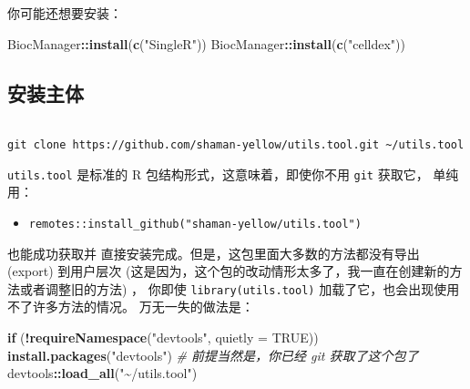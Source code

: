 \documentclass[
]{article}
\newenvironment{Shaded}{\begin{snugshade}}{\end{snugshade}}
\newcommand{\CommentTok}[1]{\textcolor[rgb]{0.56,0.35,0.01}{\textit{#1}}}
\newcommand{\ControlFlowTok}[1]{\textcolor[rgb]{0.13,0.29,0.53}{\textbf{#1}}}
\newcommand{\DataTypeTok}[1]{\textcolor[rgb]{0.13,0.29,0.53}{#1}}
\newcommand{\KeywordTok}[1]{\textcolor[rgb]{0.13,0.29,0.53}{\textbf{#1}}}
\newcommand{\NormalTok}[1]{#1}
\newcommand{\OperatorTok}[1]{\textcolor[rgb]{0.81,0.36,0.00}{\textbf{#1}}}
\newcommand{\OtherTok}[1]{\textcolor[rgb]{0.56,0.35,0.01}{#1}}
\newcommand{\StringTok}[1]{\textcolor[rgb]{0.31,0.60,0.02}{#1}}
\providecommand{\tightlist}{%
  \setlength{\itemsep}{0pt}\setlength{\parskip}{0pt}}
\begin{document}
你可能还想要安装：

\begin{Shaded}
\begin{Highlighting}[]
\NormalTok{BiocManager}\OperatorTok{::}\KeywordTok{install}\NormalTok{(}\KeywordTok{c}\NormalTok{(}\StringTok{"SingleR"}\NormalTok{))}
\NormalTok{BiocManager}\OperatorTok{::}\KeywordTok{install}\NormalTok{(}\KeywordTok{c}\NormalTok{(}\StringTok{"celldex"}\NormalTok{))}
\end{Highlighting}
\end{Shaded}

\hypertarget{ux5b89ux88c5ux4e3bux4f53}{%
\subsection{安装主体}\label{ux5b89ux88c5ux4e3bux4f53}}

\begin{tcolorbox}[colback = gray!10, colframe = red!50, width = 16cm, arc = 1mm, auto outer arc, title = {Bash input}]
\begin{verbatim}

git clone https://github.com/shaman-yellow/utils.tool.git ~/utils.tool

\end{verbatim}
\end{tcolorbox}

\texttt{utils.tool} 是标准的 R 包结构形式，这意味着，即使你不用 \texttt{git} 获取它，
单纯用：

\begin{itemize}
\tightlist
\item
  \texttt{remotes::install\_github("shaman-yellow/utils.tool")}
\end{itemize}

也能成功获取并 直接安装完成。但是，这包里面大多数的方法都没有导出 (export) 到用户层次
(这是因为，这个包的改动情形太多了，我一直在创建新的方法或者调整旧的方法) ，
你即使 \texttt{library(utils.tool)} 加载了它，也会出现使用不了许多方法的情况。
万无一失的做法是：

\begin{Shaded}
\begin{Highlighting}[]
\ControlFlowTok{if}\NormalTok{ (}\OperatorTok{!}\KeywordTok{requireNamespace}\NormalTok{(}\StringTok{"devtools"}\NormalTok{, }\DataTypeTok{quietly =} \OtherTok{TRUE}\NormalTok{))}
  \KeywordTok{install.packages}\NormalTok{(}\StringTok{"devtools"}\NormalTok{)}
\CommentTok{\# 前提当然是，你已经 git 获取了这个包了}
\NormalTok{devtools}\OperatorTok{::}\KeywordTok{load\_all}\NormalTok{(}\StringTok{"\textasciitilde{}/utils.tool"}\NormalTok{)}
\end{Highlighting}
\end{Shaded}
\end{document}
